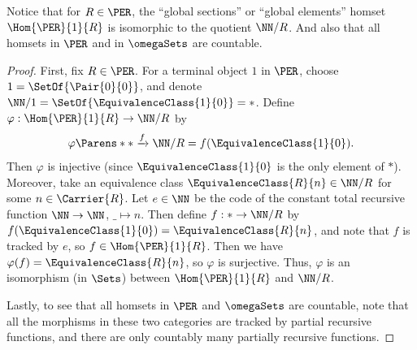 \begin{exercise}
Notice that for \(R \in \PER\), the ``global sections'' or ``global elements'' homset \(\Hom{\PER}{1}{R}\) is isomorphic to the quotient \(\NN / R\).
And also that all homsets in \(\PER\) and in \(\omegaSets\) are countable.
\end{exercise}

\begin{proof}
First, fix \(R \in \PER\). For a terminal object \(1\) in \(\PER\), choose \(1 = \SetOf{\Pair{0}{0}}\), and denote \(\NN / 1 = \SetOf{\EquivalenceClass{1}{0}} = *\).
Define \(\varphi : \Hom{\PER}{1}{R} \to \NN / R\) by
\begin{equation*}
\varphi\Parens*{* \xrightarrow{f} \NN / R}
= f(\EquivalenceClass{1}{0}).
\end{equation*}
Then \(\varphi\) is injective (since \(\EquivalenceClass{1}{0}\) is the only element of \(*\)).
Moreover, take an equivalence class \(\EquivalenceClass{R}{n} \in \NN / R\) for some \(n \in \Carrier{R}\).
Let \(e \in \NN\) be the code of the constant total recursive function \(\NN \to \NN\), \(\_ \mapsto n\).
Then define \(f : * \to \NN / R\) by \(f(\EquivalenceClass{1}{0}) = \EquivalenceClass{R}{n}\), and note that \(f\) is tracked by \(e\), so \(f \in \Hom{\PER}{1}{R}\).
Then we have \(\varphi(f) = \EquivalenceClass{R}{n}\), so \(\varphi\) is surjective.
Thus, \(\varphi\) is an isomorphism (in \(\Sets\)) between \(\Hom{\PER}{1}{R}\) and \(\NN / R\).

Lastly, to see that all homsets in \(\PER\) and \(\omegaSets\) are countable, note that all the morphisms in these two categories are tracked by partial recursive functions, and there are only countably many partially recursive functions.
\end{proof}